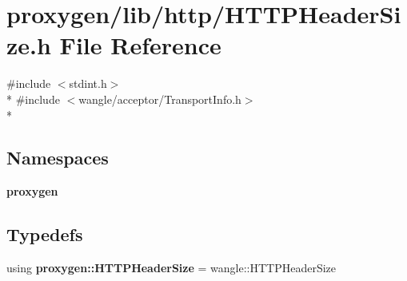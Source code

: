 \section{proxygen/lib/http/\+H\+T\+T\+P\+Header\+Size.h File Reference}
\label{HTTPHeaderSize_8h}
{\ttfamily \#include $<$stdint.\+h$>$}\\*
{\ttfamily \#include $<$wangle/acceptor/\+Transport\+Info.\+h$>$}\\*
\subsection*{Namespaces}
\begin{DoxyCompactItemize}
\item 
 {\bf proxygen}
\end{DoxyCompactItemize}
\subsection*{Typedefs}
\begin{DoxyCompactItemize}
\item 
using {\bf proxygen\+::\+H\+T\+T\+P\+Header\+Size} = wangle\+::\+H\+T\+T\+P\+Header\+Size
\end{DoxyCompactItemize}
